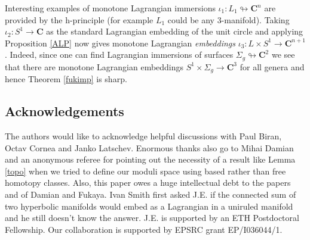 \documentclass{amsart}
\newcommand{\CC}{\mathbf{C}}
\begin{document}
Interesting examples of monotone Lagrangian immersions $\iota_1\colon L_1\looparrowright\CC^n$ are provided by the h-principle (for example $L_1$ could be any 3-manifold). Taking $\iota_2\colon S^1\to\CC$ as the standard Lagrangian embedding of the unit circle and applying Proposition \ref{ALP} now gives monotone Lagrangian \emph{embeddings} $\iota_3\colon L\times S^1\to\CC^{n+1}$. Indeed, since one can find Lagrangian immersions of surfaces $\Sigma_g\looparrowright\CC^2$ \cite{Giv} we see that there are monotone Lagrangian embeddings $S^1\times\Sigma_g\to\CC^3$ for all genera and hence Theorem \ref{fukimp} is sharp.
\subsection*{Acknowledgements}
The authors would like to acknowledge helpful discussions with Paul Biran, Octav Cornea and Janko Latschev. Enormous thanks also go to Mihai Damian and an anonymous referee for pointing out the necessity of a result like Lemma \ref{topo} when we tried to define our moduli space using based rather than free homotopy classes. Also, this paper owes a huge intellectual debt to the papers \cite{Dam} and \cite{Fuk} of Damian and Fukaya. Ivan Smith first asked J.E. if the connected sum of two hyperbolic manifolds would embed as a Lagrangian in a uniruled manifold and he still doesn't know the answer. J.E. is supported by an ETH Postdoctoral Fellowship. Our collaboration is supported by EPSRC grant EP/I036044/1.
\end{document}
